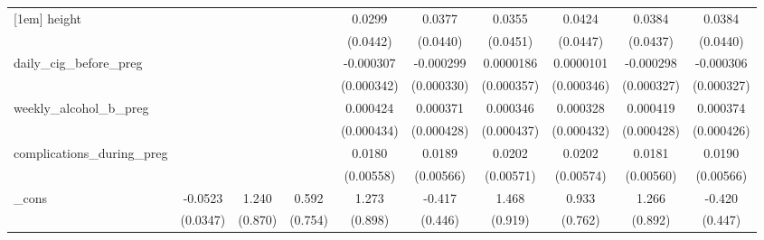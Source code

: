 \begin{table}[htbp]
\begin{tabular}{l*{9}{c}}
[1em]
height      &                     &                     &                     &      0.0299         &      0.0377         &      0.0355         &      0.0424         &      0.0384         &      0.0384         \\
            &                     &                     &                     &    (0.0442)         &    (0.0440)         &    (0.0451)         &    (0.0447)         &    (0.0437)         &    (0.0440)         \\
[1em]
daily\_cig\_before\_preg&                     &                     &                     &   -0.000307         &   -0.000299         &   0.0000186         &   0.0000101         &   -0.000298         &   -0.000306         \\
            &                     &                     &                     &  (0.000342)         &  (0.000330)         &  (0.000357)         &  (0.000346)         &  (0.000327)         &  (0.000327)         \\
[1em]
weekly\_alcohol\_b\_preg&                     &                     &                     &    0.000424         &    0.000371         &    0.000346         &    0.000328         &    0.000419         &    0.000374         \\
            &                     &                     &                     &  (0.000434)         &  (0.000428)         &  (0.000437)         &  (0.000432)         &  (0.000428)         &  (0.000426)         \\
[1em]
complications\_during\_preg&                     &                     &                     &      0.0180\sym{***}&      0.0189\sym{***}&      0.0202\sym{***}&      0.0202\sym{***}&      0.0181\sym{***}&      0.0190\sym{***}\\
            &                     &                     &                     &   (0.00558)         &   (0.00566)         &   (0.00571)         &   (0.00574)         &   (0.00560)         &   (0.00566)         \\
[1em]
\_cons      &     -0.0523         &       1.240         &       0.592         &       1.273         &      -0.417         &       1.468         &       0.933         &       1.266         &      -0.420         \\
            &    (0.0347)         &     (0.870)         &     (0.754)         &     (0.898)         &     (0.446)         &     (0.919)         &     (0.762)         &     (0.892)         &     (0.447)         \\
\hline

\end{tabular}
\end{table}
